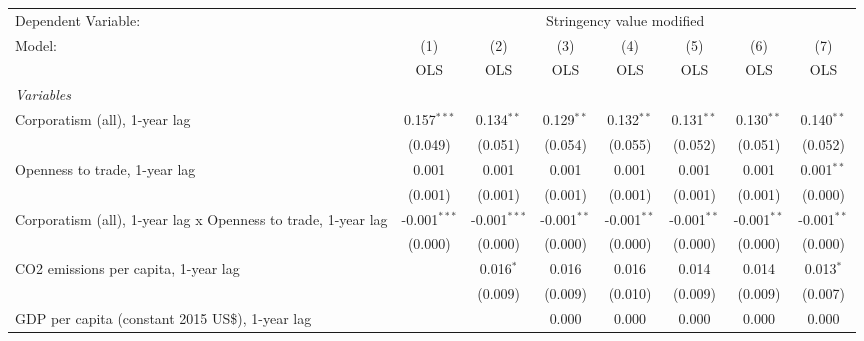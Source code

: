 
\begingroup
\centering
\begin{tabular}{lccccccc}
   \toprule
   Dependent Variable: & \multicolumn{7}{c}{Stringency value modified}\\
   Model:                                                        & (1)            & (2)            & (3)           & (4)           & (5)           & (6)           & (7)\\  
                                                                 &  OLS           & OLS            & OLS           & OLS           & OLS           & OLS           & OLS\\  
   \midrule
   \emph{Variables}\\
   Corporatism (all), 1-year lag                                 & 0.157$^{***}$  & 0.134$^{**}$   & 0.129$^{**}$  & 0.132$^{**}$  & 0.131$^{**}$  & 0.130$^{**}$  & 0.140$^{**}$\\   
                                                                 & (0.049)        & (0.051)        & (0.054)       & (0.055)       & (0.052)       & (0.051)       & (0.052)\\   
   Openness to trade, 1-year lag                                 & 0.001          & 0.001          & 0.001         & 0.001         & 0.001         & 0.001         & 0.001$^{**}$\\   
                                                                 & (0.001)        & (0.001)        & (0.001)       & (0.001)       & (0.001)       & (0.001)       & (0.000)\\   
   Corporatism (all), 1-year lag x Openness to trade, 1-year lag & -0.001$^{***}$ & -0.001$^{***}$ & -0.001$^{**}$ & -0.001$^{**}$ & -0.001$^{**}$ & -0.001$^{**}$ & -0.001$^{**}$\\   
                                                                 & (0.000)        & (0.000)        & (0.000)       & (0.000)       & (0.000)       & (0.000)       & (0.000)\\   
   CO2 emissions per capita, 1-year lag                          &                & 0.016$^{*}$    & 0.016         & 0.016         & 0.014         & 0.014         & 0.013$^{*}$\\   
                                                                 &                & (0.009)        & (0.009)       & (0.010)       & (0.009)       & (0.009)       & (0.007)\\   
   GDP per capita (constant 2015 US\$), 1-year lag               &                &                & 0.000         & 0.000         & 0.000         & 0.000         & 0.000\\   

\end{tabular}
